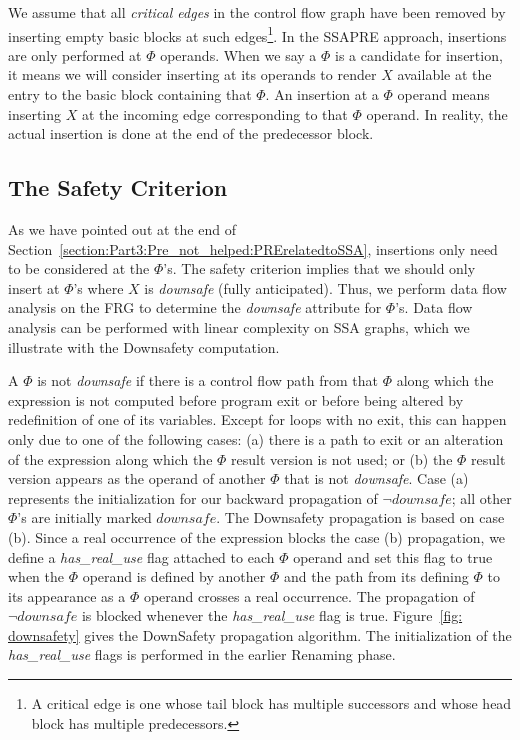 We assume that all \emph{critical edges}
in the control flow graph have been removed by inserting empty basic blocks
at such edges\footnote{A critical edge is one whose tail block has multiple
successors and whose head block has multiple predecessors.}.
In the SSAPRE approach, insertions are only performed at $\Phi$ operands.
When we say a $\Phi$ is a candidate for insertion, it means we will consider
inserting at its operands to render $X$ available at the entry to the basic
block containing that $\Phi$.  An insertion at a $\Phi$ operand means inserting
$X$ at the incoming edge corresponding to that $\Phi$ operand.  In reality,
the actual insertion is done at the end of the predecessor block.

\subsection{The Safety Criterion}

As we have pointed out at the end of 
Section~\ref{section:Part3:Pre_not_helped:PRErelatedtoSSA},
insertions only need to be considered at the $\Phi$'s.
The safety criterion implies that we should only insert at $\Phi$'s where $X$ 
is \emph{downsafe} (fully anticipated).  Thus, we perform data flow analysis on
the FRG to determine the \emph{downsafe} attribute for $\Phi$'s.
Data flow analysis can be performed with linear complexity on SSA graphs, which
we illustrate with the Downsafety computation.

A $\Phi$ is not \emph{downsafe} if there is a control flow path from that 
$\Phi$ along which the expression is not computed before program exit or 
before 
being altered by redefinition of one of its variables.  Except for loops with
no exit, this can happen only due to one of the following cases: (a) there
is a path to exit or an alteration of the expression
along which the $\Phi$ result version is not used; or (b) the $\Phi$ result
version appears as the operand of another $\Phi$ that is not \emph{downsafe}.
Case (a) represents the initialization for our backward propagation of 
$\neg downsafe$; all other $\Phi$'s are initially marked $downsafe$.
The Downsafety propagation is based on case (b).  Since a real occurrence of 
the expression blocks the case (b) propagation, we define a 
\emph{has\_real\_use} flag attached to each $\Phi$ operand and set this flag to
true when the $\Phi$ operand is defined by another $\Phi$ and the path from its
defining $\Phi$ to its appearance as a $\Phi$ operand crosses a real occurrence.
The propagation of $\neg downsafe$ is blocked whenever the \emph{has\_real\_use}
flag is true.  Figure~\ref{fig: downsafety} gives the DownSafety propagation
algorithm.  The initialization of the \emph{has\_real\_use}
flags is performed in the earlier Renaming phase.

